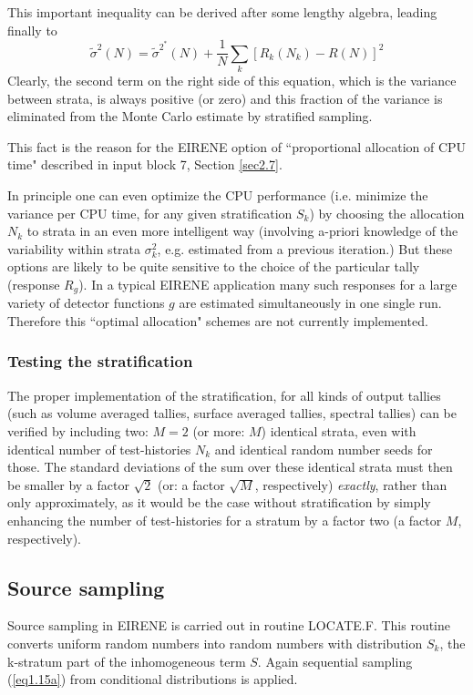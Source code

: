 This important inequality can be derived after some lengthy algebra, leading finally to
\begin{equation}
\tilde \sigma^{2}(N)=\tilde \sigma^{2^*}(N)+ \frac{1}{N}\sum_k[ R_k(N_k)- R(N)]^2
\end{equation}
Clearly, the second term on the right side of this equation, which is the variance between strata, is always positive (or zero)
and this fraction of the variance is eliminated from the Monte Carlo estimate by stratified sampling.

This fact is the reason for the EIRENE option of ``proportional allocation of CPU time" described in input block 7,
Section \ref{sec2.7}.

In principle one can even optimize the CPU performance (i.e. minimize the variance per CPU time, for any given stratification $S_k$) by choosing the
allocation $N_k$ to strata in an even more intelligent way (involving a-priori knowledge of the variability within strata $\sigma^2_k$,
e.g. estimated from a previous iteration.)  But these options are likely to be quite sensitive to the choice of the particular tally (response $R_g$).
In a typical EIRENE application many such responses for a large variety of detector functions $g$ are estimated simultaneously in one single run.
Therefore this ``optimal allocation" schemes are not currently implemented.

\subsubsection{Testing the stratification}
The proper implementation of the stratification, for all kinds of output tallies (such as volume averaged tallies,
surface averaged tallies, spectral tallies) can be verified by including two:  $M=2$ (or more: $M$) identical strata,
even with identical number of test-histories $N_k$ and identical random number seeds for those.
The standard deviations of the sum over these identical strata
must then be smaller by a factor $\sqrt{2}$  (or: a factor $\sqrt{M}$, respectively) \emph{exactly}, rather than
only approximately, as it would be the case without stratification by simply enhancing the number of test-histories
for a stratum by a factor two (a factor $M$, respectively).

\subsection{Source sampling} \label{sec1.2.2}
Source sampling in EIRENE is carried out in routine LOCATE.F. This routine converts uniform random numbers into
random numbers with distribution $S_k$, the k-stratum part of the inhomogeneous term $S$.
Again sequential sampling (\ref{eq1.15a}) from conditional distributions is applied.

